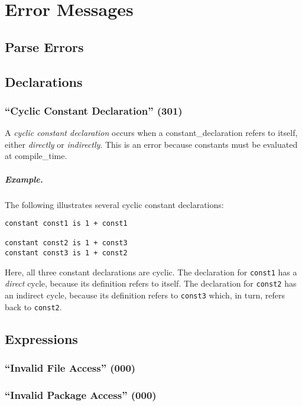 \chapter{Error Messages}

\section{Parse Errors}

\section{Declarations}

\subsection{``Cyclic Constant Declaration'' (301)}

A {\em cyclic constant declaration} occurs when a \gls{constant_declaration} refers to itself, either {\em directly} or {\em indirectly}.  This is an error because constants must be evaluated at \gls{compile_time}.

\paragraph{Example.}  The following illustrates several cyclic constant declarations:

\begin{lstlisting}
constant const1 is 1 + const1

constant const2 is 1 + const3
constant const3 is 1 + const2
\end{lstlisting}
Here, all three constant declarations are cyclic.  The declaration for \lstinline{const1} has a {\em direct} cycle, because its definition refers to itself.  The declaration for \lstinline{const2} has an indirect cycle, because its definition refers to \lstinline{const3} which, in turn, refers back to \lstinline{const2}.

\section{Expressions}

\subsection{``Invalid File Access'' (000)}

\subsection{``Invalid Package Access'' (000)}

